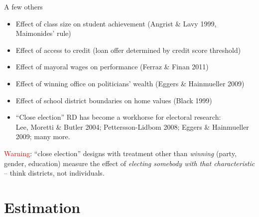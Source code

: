 \documentclass[handout,xcolor=dvipsnames]{beamer}
\begin{document}
\begin{frame}{A few others}
\small
\begin{itemize}
\item Effect of class size on student achievement (Angrist \& Lavy 1999, Maimonides' rule)
\item Effect of access to credit (loan offer determined by credit score threshold)
\item Effect of mayoral wages on performance (Ferraz \& Finan 2011)
\item Effect of winning office on politicians' wealth (Eggers \& Hainmueller 2009)
\item Effect of school district boundaries on home values (Black 1999)
\item ``Close election'' RD has become a workhorse for electoral research: \\
  {\footnotesize Lee, Moretti \& Butler 2004; Pettersson-Lidbom 2008; Eggers \& Hainmueller 2009; many more.}
\end{itemize}
\medskip
{} \textcolor{Red}{Warning}: ``close election'' designs with treatment other than \textit{winning} (party, gender, education) measure the effect of \textit{electing somebody with that characteristic} -- think districts, not individuals.
\end{frame}


\section{Estimation}
\end{document}
